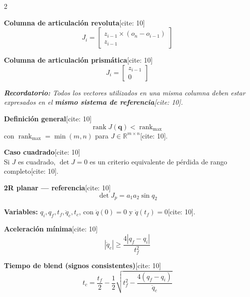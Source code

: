 \documentclass[10pt, a4paper]{article}
\begin{document}
\begin{multicols*}{2}
\begin{tcolorbox}[sectionbox, title=2. Jacobiano Geométrico{[cite: 10]}]
\textbf{Columna de articulación revoluta}[cite: 10]
\begin{equation*}
    \boxed{ J_i= \begin{bmatrix} z_{i-1}\times(o_n-o_{i-1})\\ z_{i-1} \end{bmatrix} }
\end{equation*}

\textbf{Columna de articulación prismática}[cite: 10]
\begin{equation*}
    \boxed{ J_i= \begin{bmatrix} z_{i-1}\\ 0 \end{bmatrix} }
\end{equation*}

\textit{\textbf{Recordatorio:} Todos los vectores utilizados en una misma columna deben estar expresados en el \textbf{mismo sistema de referencia}[cite: 10].}
\end{tcolorbox}

\begin{tcolorbox}[sectionbox, title=3. Singularidades{[cite: 10]}]
\textbf{Definición general}[cite: 10]
\begin{equation*}
    \boxed{ \operatorname{rank}J(\mathbf{q}) < \operatorname{rank}_{\max} }
\end{equation*}
con $\operatorname{rank}_{\max} = \min(m,n)$ para $J\in\mathbb{R}^{m\times n}$[cite: 10].

\textbf{Caso cuadrado}[cite: 10] \\
Si $J$ es cuadrado, $\boxed{ \det J=0 }$ es un criterio equivalente de pérdida de rango completo[cite: 10].

\textbf{2R planar — referencia}[cite: 10]
\begin{equation*}
    \boxed{ \det J_p = a_1a_2\sin q_2 }
\end{equation*}
\end{tcolorbox}

\begin{tcolorbox}[sectionbox, title=4. Trayectoria LSPB{[cite: 10]}]
\textbf{Variables:} $q_i, q_f, t_f, \ddot{q}_c, t_c$, con $\dot{q}(0)=0$ y $\dot{q}(t_f)=0$[cite: 10].

\textbf{Aceleración mínima}[cite: 10]
\begin{equation*}
    \boxed{ |\ddot{q}_c| \ge \frac{4|q_f-q_i|}{t_f^2} }
\end{equation*}

\textbf{Tiempo de blend (signos consistentes)}[cite: 10]
\begin{equation*}
    \boxed{ t_c = \frac{t_f}{2} - \frac{1}{2} \sqrt{ t_f^2 - \frac{4(q_f-q_i)}{\ddot{q}_c} } }
\end{equation*}


\end{tcolorbox}
\end{multicols*}
\end{document}
